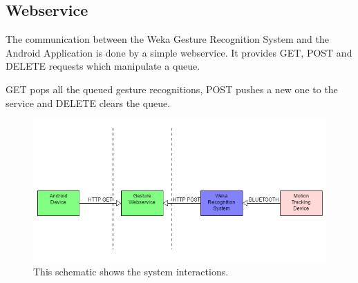 \subsection{Webservice}
The communication between the Weka Gesture Recognition System and the Android Application is done by a simple webservice.
It provides GET, POST and DELETE requests which manipulate a queue.

GET pops all the queued gesture recognitions, 
POST pushes a new one to the service and DELETE clears the queue.

\begin{figure}[!h]
\centering
\includegraphics[width=0.9\columnwidth]{img/system_diagram}
\caption{This schematic shows the system interactions.}
\label{fig:figure4}
\end{figure}
